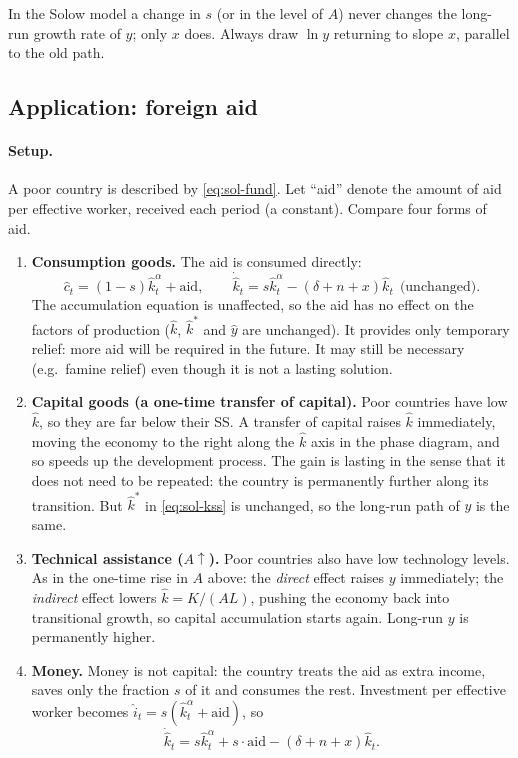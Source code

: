 \begin{tipbox}
In the Solow model a change in $s$ (or in the level of $A$) never changes the long-run growth rate of $y$; only $x$ does. Always draw $\ln y$ returning to slope $x$, parallel to the old path.
\end{tipbox}

\subsection{Application: foreign aid }

\paragraph{Setup.} A poor country is described by \eqref{eq:sol-fund}. Let ``aid'' denote the amount of aid per effective worker, received each period (a constant). Compare four forms of aid.

\begin{enumerate}
  \item \textbf{Consumption goods.} The aid is consumed directly:
  \[
  \hat c_t=(1-s)\hat k_t^{\alpha}+\text{aid},\qquad \dot{\hat k}_t=s\hat k_t^{\alpha}-(\delta+n+x)\hat k_t\ \ \text{(unchanged)}.
  \]
  The accumulation equation is unaffected, so the aid has no effect on the factors of production ($\hat k$, $\hat k^*$ and $\hat y$ are unchanged). It provides only temporary relief: more aid will be required in the future. It may still be necessary (e.g.\ famine relief) even though it is not a lasting solution.
  \item \textbf{Capital goods (a one-time transfer of capital).} Poor countries have low $\hat k$, so they are far below their SS. A transfer of capital raises $\hat k$ immediately, moving the economy to the right along the $\hat k$ axis in the phase diagram, and so speeds up the development process. The gain is lasting in the sense that it does not need to be repeated: the country is permanently further along its transition. But $\hat k^*$ in \eqref{eq:sol-kss} is unchanged, so the long-run path of $y$ is the same.
  \item \textbf{Technical assistance ($A\uparrow$).} Poor countries also have low technology levels. As in the one-time rise in $A$ above: the \emph{direct} effect raises $y$ immediately; the \emph{indirect} effect lowers $\hat k=K/(AL)$, pushing the economy back into transitional growth, so capital accumulation starts again. Long-run $y$ is permanently higher.
  \item \textbf{Money.} Money is not capital: the country treats the aid as extra income, saves only the fraction $s$ of it and consumes the rest. Investment per effective worker becomes $\hat i_t=s(\hat k_t^{\alpha}+\text{aid})$, so
  \begin{equation}\label{eq:sol-aid}
  \dot{\hat k}_t=s\hat k_t^{\alpha}+s\cdot\text{aid}-(\delta+n+x)\hat k_t .
  \end{equation}
\end{enumerate}

